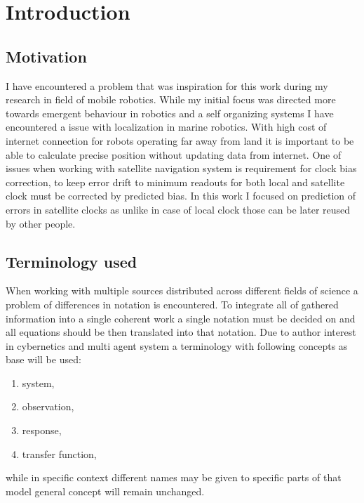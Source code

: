 \chapter{Introduction}

\section{Motivation}
I have encountered a problem that was inspiration for this work during my research in field
of mobile robotics. While my initial focus was directed more towards emergent behaviour in 
robotics and a self organizing systems I have encountered a issue with localization in marine 
robotics. With high cost of internet connection for robots operating far away from land it 
is important to be able to calculate precise position without updating data from internet.
One of issues when working with satellite navigation system is requirement for clock bias
correction, to keep error drift to minimum readouts for both local and satellite clock must
be corrected by predicted bias. In this work I focused on prediction of errors in satellite
clocks as unlike in case of local clock those can be later reused by other people.

\section{Terminology used}
When working with multiple sources distributed across different fields of science a problem of 
differences in notation is encountered. To integrate all of gathered information into a single 
coherent work a single notation must be decided on and all equations should be then translated
into that notation.
Due to author interest in cybernetics and multi agent system a terminology with following 
concepts as base will be used:
\begin{enumerate}
	\item system,
	\item observation,
	\item response,
	\item transfer function,
\end{enumerate}
while in specific context different names may be given to specific parts of that model general
concept will remain unchanged.

